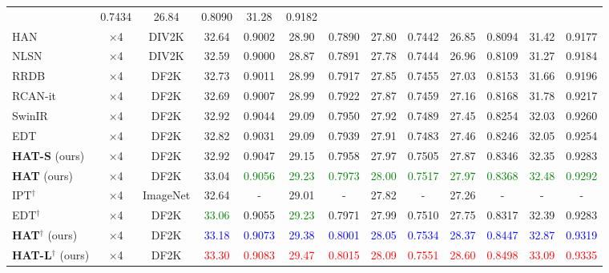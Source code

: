 \documentclass[10pt,twocolumn,letterpaper]{article}
\begin{document}
\begin{table*}[!ht]
\begin{center}
{\begin{tabular}{|l|c|c|c|c|c|c|c|c|c|c|c|c|}
& {0.7434}
& {26.84}
& {0.8090}
& {31.28}
& {0.9182}
\\
HAN & $\times$4 & DIV2K & {32.64}
& {0.9002}
& {28.90}
& {0.7890}
& {27.80}
& {0.7442}
& {26.85}
& {0.8094}
& {31.42}
& {0.9177}
\\
NLSN & $\times$4 & DIV2K & 32.59 
& 0.9000 
& 28.87 
& 0.7891 
& 27.78 
& 0.7444 
& {26.96}
& {0.8109}
& 31.27 
& 0.9184
\\
RRDB & $\times$4 & DF2K & {32.73}
& {0.9011 }
& {28.99}
& {0.7917}
& {27.85}
& {0.7455}
& {27.03}
& {0.8153}
& {31.66}
& {0.9196}
\\
RCAN-it & $\times$4 & DF2K & 32.69
& 0.9007
& 28.99
& 0.7922
& 27.87
& 0.7459
& 27.16
& 0.8168
& 31.78
& 0.9217
\\
SwinIR & $\times$4 & DF2K & 32.92
& 0.9044
& 29.09
& 0.7950
& 27.92
& 0.7489
& 27.45
& 0.8254
& 32.03
& 0.9260
\\
EDT & $\times$4 & DF2K & 32.82
& 0.9031
& 29.09
& 0.7939
& 27.91
& 0.7483
& 27.46
& 0.8246
& 32.05
& 0.9254
\\
\textbf{HAT-S} (ours) & $\times$4 & DF2K & {32.92}
& {0.9047}
& {29.15}
& {0.7958}
& {27.97}
& {0.7505}
& {27.87}
& {0.8346}
& {32.35}
& {0.9283}
\\
\textbf{HAT} (ours) & $\times$4 & DF2K & {33.04}
& \textcolor{green}{0.9056}
& \textcolor{green}{29.23}
& \textcolor{green}{0.7973}
& \textcolor{green}{28.00}
& \textcolor{green}{0.7517}
& \textcolor{green}{27.97}
& \textcolor{green}{0.8368}
& \textcolor{green}{32.48}
& \textcolor{green}{0.9292}
\\
\hdashline
IPT$^\dagger$ & $\times$4 & ImageNet & {32.64}
& {-}
& {29.01}
& {-}
& {27.82}
& {-}
& {27.26}
& {-}
& {-}
& {-}
\\
EDT$^\dagger$ & $\times$4 & DF2K & \textcolor{green}{33.06}
& {0.9055}
& \textcolor{green}{29.23}
& {0.7971}
& {27.99}
& 0.7510
& 27.75
& 0.8317
& 32.39
& 0.9283
\\
\textbf{HAT}$^\dagger$ (ours) & $\times$4 & DF2K & \textcolor{blue}{33.18}
& \textcolor{blue}{0.9073}
& \textcolor{blue}{29.38}
& \textcolor{blue}{0.8001}
& \textcolor{blue}{28.05}
& \textcolor{blue}{0.7534}
& \textcolor{blue}{28.37}
& \textcolor{blue}{0.8447}
& \textcolor{blue}{32.87}
& \textcolor{blue}{0.9319}
\\
\textbf{HAT-L}$^\dagger$ (ours) & $\times$4 & DF2K & \textcolor{red}{33.30}
& \textcolor{red}{0.9083}
& \textcolor{red}{29.47}
& \textcolor{red}{0.8015}
& \textcolor{red}{28.09}
& \textcolor{red}{0.7551}
& \textcolor{red}{28.60}
& \textcolor{red}{0.8498}
& \textcolor{red}{33.09}
& \textcolor{red}{0.9335}
\\
\hline             
\end{tabular}
}
\vspace{-0.5cm}
\end{center}
\end{table*}
\end{document}
